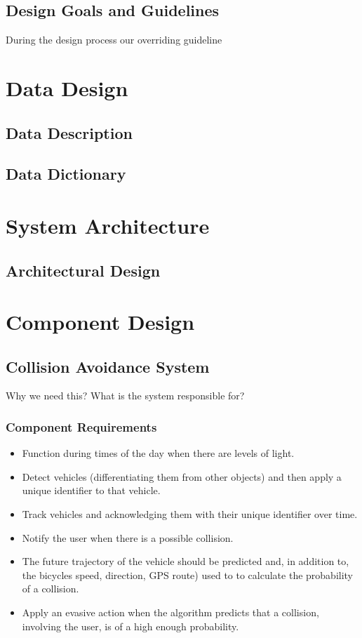 \documentclass[]{report}
\begin{document}
\section{Design Goals and Guidelines}
During the design process our overriding guideline

\chapter{Data Design}
\section{Data Description}
\section{Data Dictionary}

\chapter{System Architecture}
\section{Architectural Design}
\chapter{Component Design}

\section{Collision Avoidance System}

Why we need this? What is the system responsible for?

\subsection{Component Requirements}

\begin{itemize}
  \item Function during times of the day when there are levels of light.
  \item Detect vehicles (differentiating them from other objects) and then apply a unique identifier to that vehicle.
  \item Track vehicles and acknowledging them with their unique identifier over time.
  \item Notify the user when there is a possible collision.
  \item The future trajectory of the vehicle should be predicted and, in addition to, the bicycles speed, direction, GPS route) used to to calculate the probability of a collision.
  \item Apply an evasive action when the algorithm predicts that a collision, involving the user, is of a high enough probability. 
  
\end{itemize}
\end{document}
